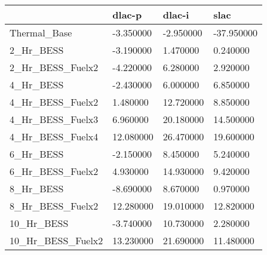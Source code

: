 \begin{tabular}{llll}
\toprule
 & dlac-p & dlac-i & slac \\
\midrule
Thermal_Base & -3.350000 & -2.950000 & -37.950000 \\
2_Hr_BESS & -3.190000 & 1.470000 & 0.240000 \\
2_Hr_BESS_Fuelx2 & -4.220000 & 6.280000 & 2.920000 \\
4_Hr_BESS & -2.430000 & 6.000000 & 6.850000 \\
4_Hr_BESS_Fuelx2 & 1.480000 & 12.720000 & 8.850000 \\
4_Hr_BESS_Fuelx3 & 6.960000 & 20.180000 & 14.500000 \\
4_Hr_BESS_Fuelx4 & 12.080000 & 26.470000 & 19.600000 \\
6_Hr_BESS & -2.150000 & 8.450000 & 5.240000 \\
6_Hr_BESS_Fuelx2 & 4.930000 & 14.930000 & 9.420000 \\
8_Hr_BESS & -8.690000 & 8.670000 & 0.970000 \\
8_Hr_BESS_Fuelx2 & 12.280000 & 19.010000 & 12.820000 \\
10_Hr_BESS & -3.740000 & 10.730000 & 2.280000 \\
10_Hr_BESS_Fuelx2 & 13.230000 & 21.690000 & 11.480000 \\
\bottomrule
\end{tabular}
